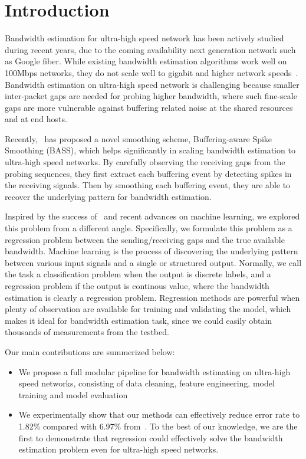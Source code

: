 \section{Introduction}
\label{sec:intro}
Bandwidth estimation for ultra-high speed network has been actively studied during recent years, due to the coming availability next generation network such as Google fiber.
While existing bandwidth estimation algorithms work well on 100Mbps networks, they do not scale well to gigabit and higher network speeds~\cite{???}.
Bandwidth estimation on ultra-high speed network is challenging because smaller inter-packet gaps are needed for probing higher bandwidth, where such fine-scale gaps are more vulnerable against buffering related noise at the shared resources and at end hosts.

Recently,~\cite{Yin2014} has proposed a novel smoothing scheme, Buffering-aware Spike Smoothing (BASS), which helps significantly in scaling bandwidth estimation to ultra-high speed networks.
By carefully observing the receiving gaps from the probing sequences, they first extract each buffering event by detecting spikes in the receiving signals.
Then by smoothing each buffering event, they are able to recover the underlying pattern for bandwidth estimation.

Inspired by the success of~\cite{Yin2014} and recent advances on machine learning, we explored this problem from a different angle.
Specifically, we formulate this problem as a regression problem between the sending/receiving gaps and the true available bandwidth.
Machine learning is the process of discovering the underlying pattern between various input signals and a single or structured output.
Normally, we call the task a classification problem when the output is discrete labels, and a regression problem if the output is continous value, where the bandwidth estimation is clearly a regression problem.
Regression methods are powerful when plenty of observation are available for training and validating the model, which makes it ideal for bandwidth estimation task, since we could easily obtain thousands of measurements from the testbed.

Our main contributions are summerized below:
\begin{itemize}
\item We propose a full modular pipeline for bandwidth estimating on ultra-high speed networks, consisting of data cleaning, feature engineering, model training and model evaluation
\item We experimentally show that our methods can effectively reduce error rate to 1.82\% compared with 6.97\% from~\cite{Yin2014}. To the best of our knowledge, we are the first to demonstrate that regression could effectively solve the bandwidth estimation problem even for ultra-high speed networks.
\end{itemize}

